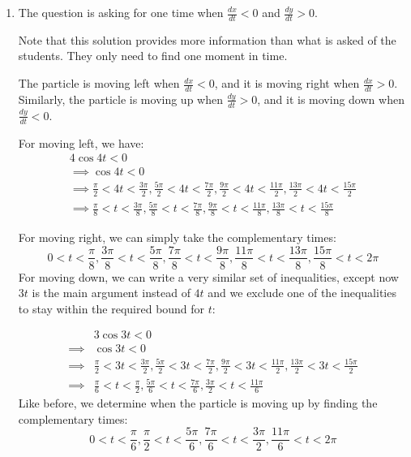 \begin{enumerate}
	\item 
    The question is asking for one time when $\frac{dx}{dt}<0$ and $\frac{dy}{dt}>0$.
    
        Note that this solution provides more information than what is asked of the students. They only need to find one moment in time.
    
        The particle is moving left when $\frac{dx}{dt} < 0$, and it is moving right when $\frac{dx}{dt} > 0$. Similarly, the particle is moving up when $\frac{dy}{dt} > 0$, and it is moving down when $\frac{dy}{dt} < 0$. 
        
        For moving left, we have:
\[
    \begin{aligned}
       4\cos{4t} < 0\\
            \implies \cos{4t} < 0\\
            \implies \frac{\pi}{2} < 4t < \frac{3\pi}{2}, \frac{5\pi}{2} < 4t < \frac{7\pi}{2}, \frac{9\pi}{2} < 4t < \frac{11\pi}{2}, \frac{13\pi}{2} < 4t < \frac{15\pi}{2}\\
            \implies \frac{\pi}{8} < t < \frac{3\pi}{8}, \frac{5\pi}{8} < t < \frac{7\pi}{8}, \frac{9\pi}{8} < t < \frac{11\pi}{8}, \frac{13\pi}{8} < t < \frac{15\pi}{8}
    \end{aligned}
\]
        
        For moving right, we can simply take the complementary times:
        \[
            0 < t < \frac{\pi}{8}, \frac{3\pi}{8} < t < \frac{5\pi}{8}, \frac{7\pi}{8} < t < \frac{9\pi}{8}, \frac{11\pi}{8} < t < \frac{13\pi}{8}, \frac{15\pi}{8} < t < 2\pi
        \]
        For moving down, we can write a very similar set of inequalities, except now $3t$ is the main argument instead of $4t$ and we exclude one of the inequalities to stay within the required bound for $t$:
        
        \[
        \begin{aligned}
            &3\cos{3t} < 0\\
            \implies &\cos{3t} < 0\\
            \implies &\frac{\pi}{2} < 3t < \frac{3\pi}{2}, \frac{5\pi}{2} < 3t < \frac{7\pi}{2}, \frac{9\pi}{2} < 3t < \frac{11\pi}{2}, \frac{13\pi}{2} < 3t < \frac{15\pi}{2}\\
            \implies &\frac{\pi}{6} < t < \frac{\pi}{2}, \frac{5\pi}{6} < t < \frac{7\pi}{6}, \frac{3\pi}{2} < t < \frac{11\pi}{6}
        \end{aligned}
        \]
        Like before, we determine when the particle is moving up by finding the complementary times:
        \[
            0 < t < \frac{\pi}{6}, \frac{\pi}{2} < t < \frac{5\pi}{6}, \frac{7\pi}{6} < t < \frac{3\pi}{2}, \frac{11\pi}{6} < t < 2\pi
        \]
        

\end{enumerate}

